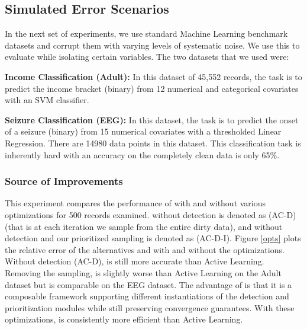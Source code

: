 \subsection{Simulated Error Scenarios}
In the next set of experiments, we use standard Machine Learning benchmark datasets and corrupt them with varying levels of systematic noise.
We use this to evaluate \sys while isolating certain variables.
The two datasets that we used were:

\vspace{0.25em}

\noindent\textbf{Income Classification (Adult): } In this dataset of 45,552 records, the task is to predict the income bracket (binary) from 12 numerical and categorical covariates with an SVM classifier. 

\vspace{0.25em}

\noindent\textbf{Seizure Classification (EEG): } In this dataset, the task is to predict the onset of a seizure (binary) from 15 numerical covariates with a thresholded Linear Regression. There are 14980 data points in this dataset. This classification task is inherently hard with an accuracy on the completely clean data is only 65\%.

\subsubsection{Source of Improvements}\label{comp}
This experiment compares the performance of \sys with and without various optimizations for 500 records examined. 
\sys without detection is denoted as (AC-D) (that is at each iteration we sample from the entire dirty data), and \sys without detection and our prioritized sampling is denoted as (AC-D-I).
Figure \ref{opts} plots the relative error of the alternatives and \sys with and without the optimizations.
Without detection (AC-D), \sys is still more accurate than Active Learning.
Removing the sampling, \sys is slightly worse than Active Learning on the Adult dataset but is comparable on the EEG dataset.
The advantage of \sys is that it is a composable framework supporting different instantiations of the detection and prioritization modules while still preserving convergence guarantees.
With these optimizations, \sys is consistently more efficient than Active Learning.

